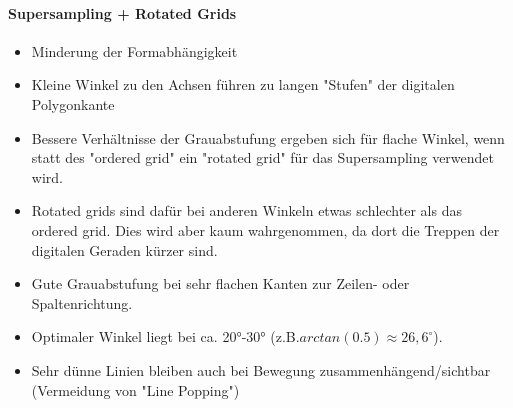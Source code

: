 \documentclass[10pt,landscape]{article}
\begin{document}
\begin{multicols}{3}
\paragraph{Supersampling + Rotated Grids}
\begin{itemize}
  \item Minderung der Formabhängigkeit
  \item Kleine Winkel zu den Achsen führen zu langen "Stufen" der digitalen Polygonkante
  \item Bessere Verhältnisse der Grauabstufung ergeben sich für flache Winkel, wenn statt des "ordered grid" ein "rotated grid" für das Supersampling verwendet wird.
  \item Rotated grids sind dafür bei anderen Winkeln etwas schlechter als das ordered grid. Dies wird aber kaum wahrgenommen, da dort die Treppen der digitalen Geraden kürzer sind.
  \item Gute Grauabstufung bei sehr flachen Kanten zur Zeilen- oder Spaltenrichtung.
  \item Optimaler Winkel liegt bei ca. 20°-30° (z.B.$arctan(0.5) \approx 26,6^{\circ}$).
  \item Sehr dünne Linien bleiben auch bei Bewegung zusammenhängend/sichtbar (Vermeidung von "Line Popping")
\end{itemize}

\end{multicols}
\end{document}
